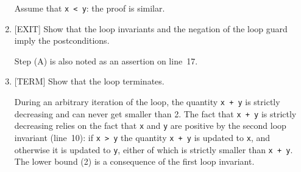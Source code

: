 \begin{flex}
\begin{solution}
\begin{enumerate}[label=\alph*)]
  Assume that \lstinline'x < y': the proof is similar.

\item {[EXIT]} %
  Show that the loop invariants and the negation of
  the loop guard imply the postconditions.

  \begin{enumerate}[label=\Alph*.]
  \end{enumerate}
  Step (A) is also noted as an assertion on line~17.


\item {[TERM]} %
  Show that the loop terminates.

  During an arbitrary iteration of the loop, the quantity %
  \lstinline'x + y' is strictly decreasing and can never get smaller
  than 2.  The fact that \lstinline'x + y' is strictly decreasing
  relies on the fact that \lstinline'x' and \lstinline'y' are positive
  by the second loop invariant (line~10):
  if \lstinline'x > y' the quantity \lstinline'x + y' is updated to
  \lstinline'x', and otherwise it is updated to \lstinline'y', either
  of which is strictly smaller than \lstinline'x + y'.  The lower
  bound (2) is a consequence of the first loop invariant.
\end{enumerate}

\end{solution}
\end{flex}

\printsolutions
% 
% 

